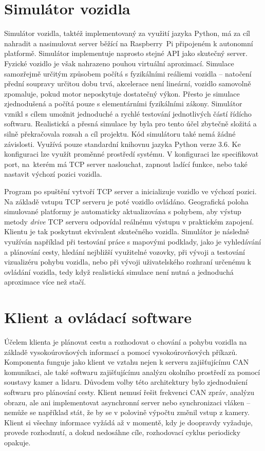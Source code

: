 \documentclass[czech, bachelor]{diploma}
\begin{document}
\chapter{Simulátor vozidla}

Simulátor vozidla, taktéž implementovaný za využití jazyka Python, má za cíl nahradit a nasimulovat server běžící na Raspberry~Pi
připojeném k autonomní platformě. Simulátor implementuje naprosto stejné API jako skutečný server. Fyzické vozidlo je však
nahrazeno pouhou virtuální aproximací. Simulace samozřejmě určitým způsobem počítá s fyzikálními reáliemi vozidla -- natočení
přední soupravy určitou dobu trvá, akcelerace není lineární, vozidlo samovolně zpomaluje, pokud motor neposkytuje dostatečný
výkon. Přesto je simulace zjednodušená a počítá pouze s elementárními fyzikálními zákony. Simulátor vznikl s cílem umožnit
jednoduché a rychlé testování jednotlivých částí řídícho softwaru. Realistická a přesná simulace by byla pro tento účel zbytečně
složitá a silně překračovala rozsah a cíl projektu. Kód simulátoru také nemá žádné závislosti. Využívá pouze standardní knihovnu
jazyka Python verze 3.6. Ke konfiguraci lze využít proměnné prostředí systému. V konfiguraci lze specifikovat port, na~kterém má
TCP server naslouchat, zapnout ladící funkce, nebo také nastavit výchozí pozici vozidla.

Program po spuštění vytvoří TCP server a inicializuje vozidlo ve výchozí pozici. Na základě vstupu TCP serveru je poté vozidlo
ovládáno. Geografická poloha simulované platformy je automaticky aktualizována s pohybem, aby výstup metody \emph{drive} TCP
serveru odpovídal reálnému výstupu v praktickém zapojení. Klientu je tak poskytnut ekvivalent skutečného vozidla. Simulátor je
následně využíván například při testování práce s mapovými podklady, jako je vyhledávání a plánování cesty, hledání nejbližší
využitelné vozovky, při vývoji a testování vizualizéru pohybu vozidla, nebo při vývoji uživatelského rozhraní určenému k ovládání
vozidla, tedy když realistická simulace není nutná a jednoduchá aproximace více než stačí.

\chapter{Klient a ovládací software}

Účelem klienta je plánovat cestu a rozhodovat o chování a pohybu vozidla na základě vysokoúrovňových informací a pomocí
vysokoúrovňových příkazů. Komponenta funguje jako klient ve vztahu nejen k serveru zajišťujícímu CAN komunikaci, ale také
softwaru zajišťujícímu analýzu okolního prostředí za pomocí soustavy kamer a lidaru. Důvodem volby této architektury bylo
zjednodušení softwaru pro plánování cesty. Klient nemusí řešit frekvenci CAN zpráv, analýzu obrazu, ale ani implementovat
asynchronní server nebo synchronizaci vláken -- nemůže se například stát, že by se v polovině výpočtu změnil vstup z kamery.
Klient si všechny informace vyžádá až v momentě, kdy je doopravdy vyžaduje, provede rozhodnutí, a dokud nedosáhne cíle, rozhodovací
cyklus periodicky opakuje.
\end{document}
